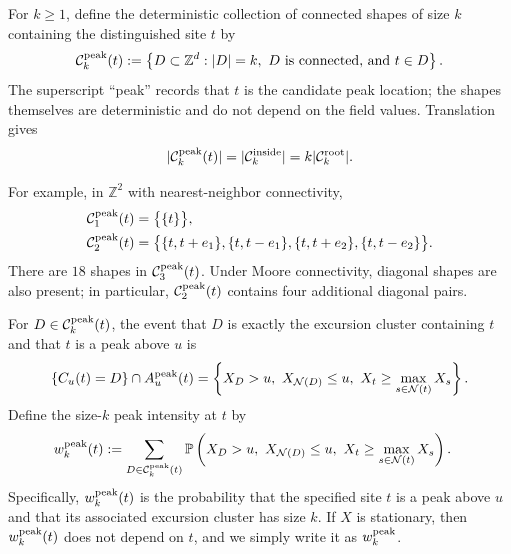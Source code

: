 \documentclass[aap,preprint]{imsart}
\theoremstyle{plain}
\theoremstyle{definition}
\def\P{{\mathbb P}}
\def\Z{{\mathbb Z}}
\begin{document}
	
	For $k\geq1$, define the deterministic collection of connected shapes of size
	$k$ containing the distinguished site $t$ by
	\begin{equation}\label{eq:C-peak}
		\mathcal C_k^{\rm peak}(t)
		:=
		\left\{
		D\subset\Z^d:
		|D|=k,\ D\text{ is connected, and }t\in D
		\right\}.
	\end{equation}
	The superscript ``peak'' records that $t$ is the candidate peak location; the
	shapes themselves are deterministic and do not depend on the field values.
	Translation gives
	\begin{equation}\label{eq:C-peak-cardinality}
		|\mathcal C_k^{\rm peak}(t)|
		=|\mathcal C_k^{\rm inside}|
		=k|\mathcal C_k^{\rm root}|.
	\end{equation}
	
	For example, in $\Z^2$ with nearest-neighbor connectivity,
	\begin{equation*}
		\begin{split}
			\mathcal C_1^{\rm peak}(t) &= \bigl\{\{t\}\bigr\}, \\
			\mathcal C_2^{\rm peak}(t) &= \bigl\{\{t,t+e_1\}, \{t,t-e_1\},
			\{t,t+e_2\}, \{t,t-e_2\}\bigr\}.
		\end{split}
	\end{equation*}
	There are $18$ shapes in $\mathcal C_3^{\rm peak}(t)$.  Under Moore
	connectivity, diagonal shapes are also present; in particular,
	$\mathcal C_2^{\rm peak}(t)$ contains four additional diagonal pairs.
	
	For $D\in\mathcal C_k^{\rm peak}(t)$, the event that $D$ is exactly the
	excursion cluster containing $t$ and that $t$ is a peak above $u$ is
	\begin{equation}\label{eq:peak-shape-event}
		\{C_u(t)=D\}\cap A_u^{\rm peak}(t)
		=
		\left\{
		X_D>u,\ X_{\mathcal N(D)}\leq u,\
		X_t\ge \max_{s\in\mathcal N(t)}X_s
		\right\}.
	\end{equation}
	Define the size-$k$ peak intensity at $t$ by
	\begin{equation}\label{eq:w-peak}
		\begin{split}
			w_k^{\rm peak}(t)
			&:=\sum_{D\in\mathcal C_k^{\rm peak}(t)}
			\P\left(
			X_D>u,\ X_{\mathcal N(D)}\leq u,\
			X_t\ge \max_{s\in\mathcal N(t)}X_s
			\right).
		\end{split}
	\end{equation}
	Specifically, $w_k^{\rm peak}(t)$ is the probability that the specified site $t$ is
	a peak above $u$ and that its associated excursion cluster has size $k$. If $X$ is stationary, then $w_k^{\rm peak}(t)$ does not depend on $t$, and we simply write it as $w_k^{\rm peak}$.
	
\end{document}
